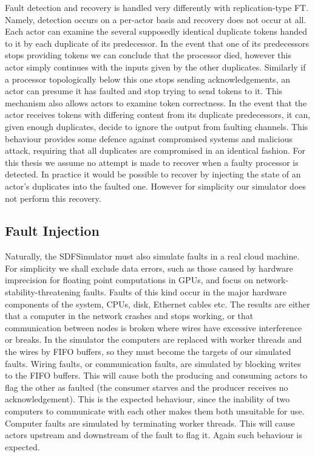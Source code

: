 Fault detection and recovery is handled very differently with replication-type FT.
Namely, detection occurs on a per-actor basis and recovery does not occur at all.
Each actor can examine the several supposedly identical duplicate tokens handed to it by each duplicate of its predecessor.
In the event that one of its predecessors stops providing tokens we can conclude that the processor died, however this actor simply continues with the inputs given by the other duplicates.
Similarly if a processor topologically below this one stops sending acknowledgements, an actor can presume it has faulted and stop trying to send tokens to it.
This mechanism also allows actors to examine token correctness.
In the event that the actor receives tokens with differing content from its duplicate predecessors, it can, given enough duplicates, decide to ignore the output from faulting channels.
This behaviour provides some defence against compromised systems and malicious attack, requiring that all duplicates are compromised in an identical fashion.
For this thesis we assume no attempt is made to recover when a faulty processor is detected.
In practice it would be possible to recover by injecting the state of an actor's duplicates into the faulted one.
However for simplicity our simulator does not perform this recovery.

\subsection{Fault Injection}

Naturally, the SDFSimulator must also simulate faults in a real cloud machine.
For simplicity we shall exclude data errors, such as those caused by hardware imprecision for floating point computations in GPUs, and focus on network-stability-threatening faults.
Faults of this kind occur in the major hardware components of the system, CPUs, disk, Ethernet cables etc.
The results are either that a computer in the network crashes and stops working, or that communication between nodes is broken where wires have excessive interference or breaks.
In the simulator the computers are replaced with worker threads and the wires by FIFO buffers, so they must become the targets of our simulated faults.
Wiring faults, or communication faults, are simulated by blocking writes to the FIFO buffers.
This will cause both the producing and consuming actors to flag the other as faulted (the consumer starves and the producer receives no acknowledgement).
This is the expected behaviour, since the inability of two computers to communicate with each other makes them both unsuitable for use.
Computer faults are simulated by terminating worker threads.
This will cause actors upstream and downstream of the fault to flag it.
Again such behaviour is expected.

